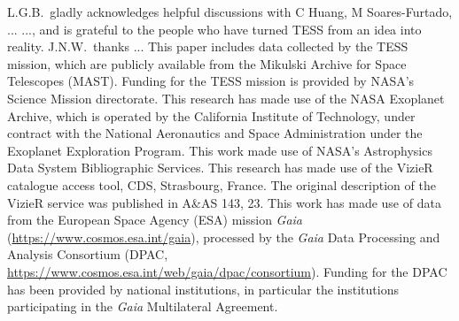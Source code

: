 \documentclass[12pt,twocolumn,tighten]{aastex62}
\begin{document}
\acknowledgements
L.G.B.\ gladly acknowledges helpful discussions with
C Huang, M Soares-Furtado, ...
..., and is
grateful to the people who have turned TESS from an idea into reality.
%
J.N.W.\ thanks ...
%
This paper includes data collected by the TESS mission, which are
publicly available from the Mikulski Archive for Space Telescopes
(MAST).
%
Funding for the TESS mission is provided by NASA's Science Mission
directorate.
%
This research has made use of the NASA Exoplanet Archive, which is
operated by the California Institute of Technology, under contract
with the National Aeronautics and Space Administration under the
Exoplanet Exploration Program.
%
This work made use of NASA's Astrophysics Data System Bibliographic
Services.
%
This research has made use of the VizieR catalogue access tool, CDS,
Strasbourg, France. The original description of the VizieR service was
published in A\&AS 143, 23.
%
This work has made use of data from the European Space Agency (ESA)
mission {\it Gaia} (\url{https://www.cosmos.esa.int/gaia}), processed
by the {\it Gaia} Data Processing and Analysis Consortium (DPAC,
\url{https://www.cosmos.esa.int/web/gaia/dpac/consortium}). Funding
for the DPAC has been provided by national institutions, in particular
the institutions participating in the {\it Gaia} Multilateral
Agreement.
%
\newline
%
%

\clearpage
\newpage

                            
 
\end{document}
